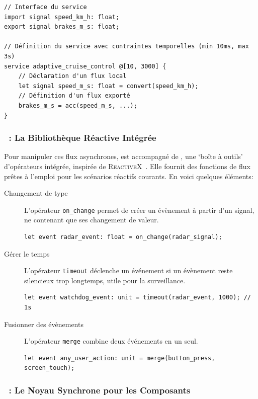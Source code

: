 \begin{lstlisting}[language=GRust]
// Interface du service
import signal speed_km_h: float;
export signal brakes_m_s: float;

// Définition du service avec contraintes temporelles (min 10ms, max 3s)
service adaptive_cruise_control @[10, 3000] {
    // Déclaration d'un flux local
    let signal speed_m_s: float = convert(speed_km_h);
    // Définition d'un flux exporté
    brakes_m_s = acc(speed_m_s, ...);
}
\end{lstlisting}

\subsubsection{\GReact~: La Bibliothèque Réactive Intégrée}

Pour manipuler ces flux asynchrones, \GRFRP est accompagné de \GReact, une `boîte à outils'
d'opérateurs intégrée, inspirée de \textsc{ReactiveX}~\cite{reactivex}. Elle fournit des fonctions
de flux prêtes à l'emploi pour les scénarios réactifs courants. En voici quelques éléments:

\begin{description}
      \item[Changement de type] L'opérateur \texttt{on\_change} permet de créer un évènement à
            partir d'un signal, ne contenant que ses changement de valeur.
            \begin{lstlisting}[language=GRust, numbers=none]
let event radar_event: float = on_change(radar_signal);
\end{lstlisting}
      \item[Gérer le temps] L'opérateur \texttt{timeout} déclenche un événement si un évènement
            reste silencieux trop longtemps, utile pour la surveillance.
            \begin{lstlisting}[language=GRust, numbers=none]
let event watchdog_event: unit = timeout(radar_event, 1000); // 1s
\end{lstlisting}
      \item[Fusionner des évènements] L'opérateur \texttt{merge} combine deux événements en un seul.
            \begin{lstlisting}[language=GRust, numbers=none]
let event any_user_action: unit = merge(button_press, screen_touch);
\end{lstlisting}
\end{description}

\subsubsection{\GRSync~: Le Noyau Synchrone pour les Composants}

